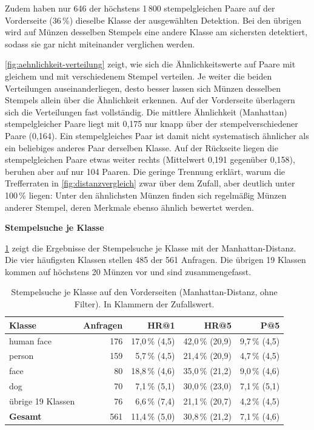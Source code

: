 \noindent Zudem haben nur 646 der höchstens 1\,800 stempelgleichen Paare auf der Vorderseite (36\,\%) dieselbe Klasse der ausgewählten Detektion. Bei den übrigen wird auf Münzen desselben Stempels eine andere Klasse am sichersten detektiert, sodass sie gar nicht miteinander verglichen werden.



\noindent \cref{fig:aehnlichkeit-verteilung} zeigt, wie sich die Ähnlichkeitswerte auf Paare mit gleichem und mit verschiedenem Stempel verteilen. Je weiter die beiden Verteilungen auseinanderliegen, desto besser lassen sich Münzen desselben Stempels allein über die Ähnlichkeit erkennen. Auf der Vorderseite überlagern sich die Verteilungen fast vollständig. Die mittlere Ähnlichkeit (Manhattan) stempelgleicher Paare liegt mit 0,175 nur knapp über der stempelverschiedener Paare (0,164). Ein stempelgleiches Paar ist damit nicht systematisch ähnlicher als ein beliebiges anderes Paar derselben Klasse. Auf der Rückseite liegen die stempelgleichen Paare etwas weiter rechts (Mittelwert 0,191 gegenüber 0,158), beruhen aber auf nur 104 Paaren. Die geringe Trennung erklärt, warum die Trefferraten in \cref{fig:distanzvergleich} zwar über dem Zufall, aber deutlich unter 100\,\% liegen: Unter den ähnlichsten Münzen finden sich regelmäßig Münzen anderer Stempel, deren Merkmale ebenso ähnlich bewertet werden.

\vspace{\baselineskip}
 
\noindent \textbf{Stempelsuche je Klasse}
 
\noindent \cref{tab:klassen-suche} zeigt die Ergebnisse der Stempelsuche je Klasse mit der Manhattan-Distanz. Die vier häufigsten Klassen stellen 485 der 561 Anfragen. Die übrigen 19 Klassen kommen auf höchstens 20 Münzen vor und sind zusammengefasst.
 
\begin{table}[H]
\centering
\small
\caption{Stempelsuche je Klasse auf den Vorderseiten (Manhattan-Distanz, ohne Filter). In Klammern der Zufallswert.}
\label{tab:klassen-suche}
\begin{tabular}{|l|r|r|r|r|}
\hline
\textbf{Klasse} & \textbf{Anfragen} & \textbf{HR@1} & \textbf{HR@5} & \textbf{P@5} \\ \hline
human face        & 176 & 17{,}0\,\% (4{,}5) & 42{,}0\,\% (20{,}9) & 9{,}7\,\% (4{,}5) \\ \hline
person            & 159 & 5{,}7\,\% (4{,}5)  & 21{,}4\,\% (20{,}9) & 4{,}7\,\% (4{,}5) \\ \hline
face              & 80  & 18{,}8\,\% (4{,}6) & 35{,}0\,\% (21{,}2) & 9{,}0\,\% (4{,}6) \\ \hline
dog               & 70  & 7{,}1\,\% (5{,}1)  & 30{,}0\,\% (23{,}0) & 7{,}1\,\% (5{,}1) \\ \hline
übrige 19 Klassen & 76  & 6{,}6\,\% (7{,}4)  & 21{,}1\,\% (20{,}7) & 4{,}2\,\% (4{,}5) \\ \hline
\hline
\textbf{Gesamt}   & 561 & 11{,}4\,\% (5{,}0) & 30{,}8\,\% (21{,}2) & 7{,}1\,\% (4{,}6) \\ \hline
\end{tabular}
\end{table}
 

